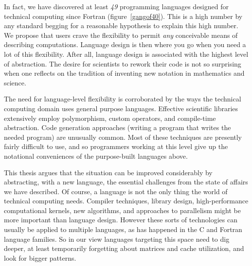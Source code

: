 In fact, we have discovered at least \emph{49} programming languages
designed for technical computing since Fortran (figure~\ref{gangof40}).
This is a high number by any standard begging for  a reasonable hypothesis to
explain this high number.
We propose that users crave 
the flexibility to permit \emph{any} conceivable means of
describing computations.
Language design is then 
where you go when you need a lot
of this flexibility.
After all, language design is  associated with the highest level of abstraction.
The desire for scientists to rework their code  is not so surprising when one reflects on the tradition
of inventing new notation in mathematics and science.

The need for language-level flexibility is corroborated by
the ways the technical computing domain uses general purpose
languages.
Effective scientific libraries extensively employ
polymorphism, custom operators, and compile-time abstraction.
Code generation approaches (writing a program that writes the needed
program) are unusually common.
Most of these techniques are presently fairly difficult to use, and so
programmers working at this level give up the notational conveniences
of the purpose-built languages above.



This thesis argues that the situation can be improved considerably by
abstracting, with a new language, the essential challenges from the state
of affairs we have described.
Of course, a language is not the only thing the world of technical
computing needs.
Compiler techniques, library design, high-performance
computational kernels, new algorithms, and approaches to parallelism might
be more important than language design.
However these sorts of technologies can usually be applied to multiple
languages, as has happened in the C and Fortran language families.
So in our view languages targeting this space need to dig deeper,
at least temporarily forgetting about matrices and cache utilization,
and look for bigger patterns.


